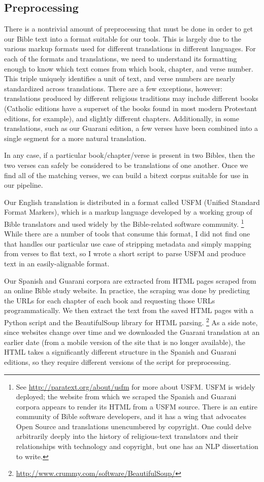 \subsection{Preprocessing}
There is a nontrivial amount of preprocessing that must be done in order to get
our Bible text into a format suitable for our tools.
This is largely due to the various markup formats used for different
translations in different languages. For each of the formats and translations,
we need to understand its formatting enough to know which text comes from
which book, chapter, and verse number. This triple uniquely identifies a
unit of text, and verse numbers are nearly standardized across translations.
There are a few exceptions, however: translations produced by different
religious traditions may include different books (Catholic editions have
a superset of the books found in most modern Protestant editions, for example),
and slightly different chapters. Additionally, in some translations, such as
our Guarani edition, a few verses have been combined into a single segment for
a more natural translation.

In any case, if a particular book/chapter/verse is present in two Bibles, then
the two verses can safely be considered to be translations of one
another. Once we find all of the matching verses, we can build a bitext corpus
suitable for use in our pipeline.

Our English translation is distributed in a format called USFM (Unified
Standard Format Markers), which is a markup language developed by a working
group of Bible translators and used widely by the Bible-related software
community.
\footnote{See \url{http://paratext.org/about/usfm} for more about USFM. USFM is
widely deployed; the website from which we scraped the Spanish and Guarani
corpora appears to render its HTML from a USFM source. 
There is an entire community of Bible software developers, and it has a wing
that advocates Open Source and translations unencumbered by copyright.  One
could delve arbitrarily deeply into the history of religious-text translators
and their relationships with technology and copyright, but one has an NLP
dissertation to write.}
While there are a number of tools that consume this format, I did not find one
that handles our particular use case of stripping metadata and simply mapping
from verses to flat text, so I wrote a short script to parse USFM and produce
text in an easily-alignable format.

Our Spanish and Guarani corpora are extracted from HTML pages scraped from an
online Bible study website. In practice, the scraping was done by predicting
the URLs for each chapter of each book and requesting those URLs
programmatically. We then extract the text from the saved HTML pages with a
Python script and the BeautifulSoup library for HTML parsing.
\footnote{\url{http://www.crummy.com/software/BeautifulSoup/}}
As a side note, since websites change over time and we
downloaded the Guarani translation at an earlier date (from a mobile version of
the site that is no longer available), the HTML takes a significantly different
structure in the Spanish and Guarani editions, so they require different
versions of the script for preprocessing.

